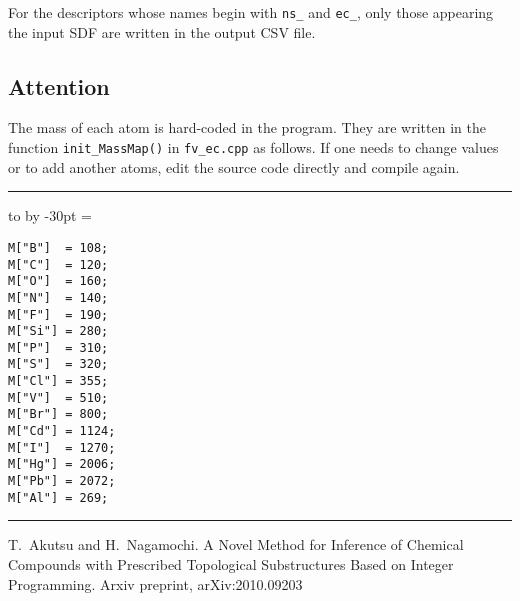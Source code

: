 \documentclass[11pt, titlepage, dvipdfmx, twoside]{article}
\newenvironment{myframe}{\begin{trivlist}\item[]
    \hrule
    \hbox to \linewidth\bgroup
    \advance\linewidth by -30pt
    \hsize=\linewidth
    \vrule\hfill
    \vbox\bgroup
    \vskip15pt
    \def\thempfootnote{\arabic{mpfootnote}}
    \begin{minipage}{\linewidth}}{%
    \end{minipage}\vskip15pt
    \egroup\hfill\vrule
    \egroup\hrule
\end{trivlist}}
\begin{document}
For the descriptors whose names begin with {\tt ns\_} and {\tt ec\_},
only those appearing the input SDF
are written in the output CSV file. 

\subsection{Attention}
\label{sec:caution}

The mass of each atom is hard-coded in the program.
They are written in the function {\tt init\_MassMap()}
in {\tt fv\_ec.cpp} as follows.
If one needs to change values or to add another atoms,
edit the source code directly and compile again.

\begin{myframe}
\begin{verbatim}
M["B"]  = 108;
M["C"]  = 120;
M["O"]  = 160;
M["N"]  = 140;
M["F"]  = 190;
M["Si"] = 280;
M["P"]  = 310;
M["S"]  = 320;
M["Cl"] = 355;
M["V"]  = 510;
M["Br"] = 800;
M["Cd"] = 1124;
M["I"]  = 1270;
M["Hg"] = 2006;
M["Pb"] = 2072;
M["Al"] = 269;
\end{verbatim}
\end{myframe}

\begin{thebibliography}{9}
   T.~Akutsu and H.~Nagamochi.
   \newblock A Novel Method for Inference of Chemical Compounds with Prescribed Topological Substructures Based on Integer Programming.
   \newblock Arxiv preprint, arXiv:2010.09203
\end{thebibliography}
\end{document}

